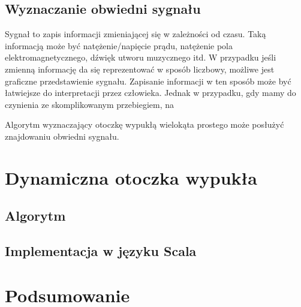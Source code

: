         \section{Wyznaczanie obwiedni sygnału}
        Sygnał to zapis informacji zmieniającej się w zależności od czasu. Taką informacją może być natężenie/napięcie prądu, natężenie pola elektromagnetycznego, dźwięk utworu muzycznego itd. W przypadku jeśli zmienną informację da się  reprezentować w sposób liczbowy, możliwe jest graficzne przedstawienie sygnału. Zapisanie informacji w ten sposób może być łatwiejsze do interpretacji przez człowieka. Jednak w przypadku, gdy mamy do czynienia ze skomplikowanym przebiegiem, na
        
        Algorytm wyznaczający otoczkę wypukłą wielokąta prostego może posłużyć znajdowaniu obwiedni sygnału.
        
    \chapter{Dynamiczna otoczka wypukła}
    	\section{Algorytm}
    	\section{Implementacja w języku Scala} 
	\chapter{Podsumowanie} 
      
    

